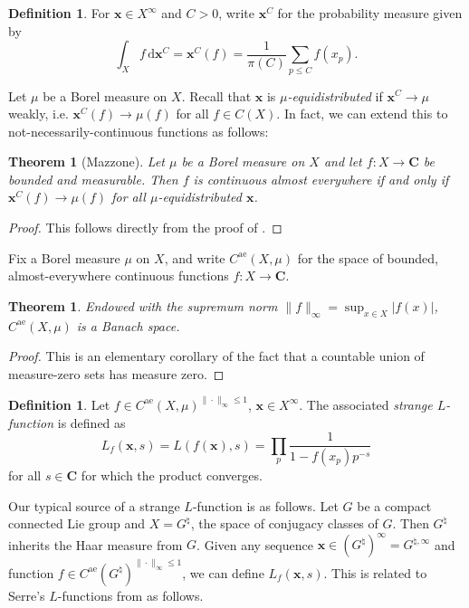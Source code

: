 \documentclass{article}
\newcommand{\bC}{\mathbf{C}}
\newcommand{\bx}{{\boldsymbol x}}
\newcommand{\alev}{\mathrm{ae}}
\newcommand{\dd}{\mathrm{d}}
\newtheorem{theorem}[subsection]{Theorem}
\theoremstyle{definition}
\newtheorem{definition}[subsection]{Definition}
\begin{document}
\begin{definition}
For $\bx\in X^\infty$ and $C>0$, write $\bx^C$ for the probability measure 
given by 
\[
	\int_X f\, \dd \bx^C = \bx^C(f) = \frac{1}{\pi(C)} \sum_{p\leqslant C} f(x_p) .
\]
\end{definition}

Let $\mu$ be a Borel measure on $X$. Recall that $\bx$ is 
\emph{$\mu$-equidistributed} if $\bx^C\to \mu$ weakly, i.e. 
$\bx^C(f) \to \mu(f)$ for all $f\in C(X)$. In fact, we can extend this to 
not-necessarily-continuous functions as follows:

\begin{theorem}[Mazzone]
Let $\mu$ be a Borel measure on $X$ and let $f\colon X\to \bC$ be bounded and 
measurable. Then $f$ is continuous almost everywhere if and only if 
$\bx^C(f) \to \mu(f)$ for all $\mu$-equidistributed $\bx$. 
\end{theorem}
\begin{proof}
This follows directly from the proof of \cite[Th.1]{mazzone-1995}.
\end{proof}

Fix a Borel measure $\mu$ on $X$, and write $C^\alev(X,\mu)$ for the space of 
bounded, almost-everywhere continuous functions $f\colon X\to \bC$. 


\begin{theorem}
Endowed with the supremum norm $\|f\|_\infty=\sup_{x\in X} |f(x)|$, 
$C^\alev(X,\mu)$ is a Banach space. 
\end{theorem}
\begin{proof}
This is an elementary corollary of the fact that a countable union of 
measure-zero sets has measure zero. 
\end{proof}

\begin{definition}
Let $f\in C^\alev(X,\mu)^{\|\cdot\|_\infty\leqslant 1}$, $\bx\in X^\infty$. The 
associated \emph{strange $L$-function} is defined as 
\[
	L_f(\bx,s) = L(f(\bx),s) = \prod_p \frac{1}{1-f(x_p) p^{-s}} 
\]
for all $s\in \bC$ for which the product converges. 
\end{definition}

Our typical source of a strange $L$-function is as follows. Let $G$ be a 
compact connected Lie group and $X=G^\natural$, the space of conjugacy 
classes of $G$. Then $G^\natural$ inherits the Haar measure from $G$. Given 
any sequence $\bx\in (G^\natural)^\infty = G^{\natural,\infty}$ and 
function $f\in C^\alev(G^\natural)^{\|\cdot\|_\infty\leqslant 1}$, we can 
define $L_f(\bx,s)$. This is 
related to Serre's $L$-functions from \cite[A.2]{serre-1968} as follows. 
\end{document}

